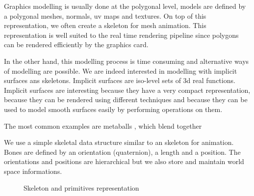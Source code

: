 \documentclass[11pt]{article}
\numberwithin{figure}{section}
\begin{document}
\maketitle

	
Graphics modelling is usually done at the polygonal level, models are defined by a polygonal meshes, normals, uv maps and textures. On top of this representation, we often create a skeleton for mesh animation. This representation is well suited to the real time rendering pipeline since polygons can be rendered efficiently by the graphics card.

In the other hand, this modelling process is time consuming and alternative ways of modelling are possible. We are indeed interested in modelling with implicit surfaces ans skeletons. Implicit surfaces are iso-level sets of 3d real functions. Implicit surfaces are interesting because they have a very compact representation, because they can be rendered using different techniques and because they can be used to model smooth surfaces easily by performing operations on them.

The most common examples are metaballs , which blend together




We use a simple skeletal data structure similar to an skeleton for animation. Bones are defined by an orientation (quaternion), a length and a position. The orientations and positions are hierarchical but we also store and maintain world space informations.

\begin{figure}[!h!]
  \centering
  \caption{Skeleton and primitives representation}
  \label{fig:animals}
\end{figure}
\end{document}
